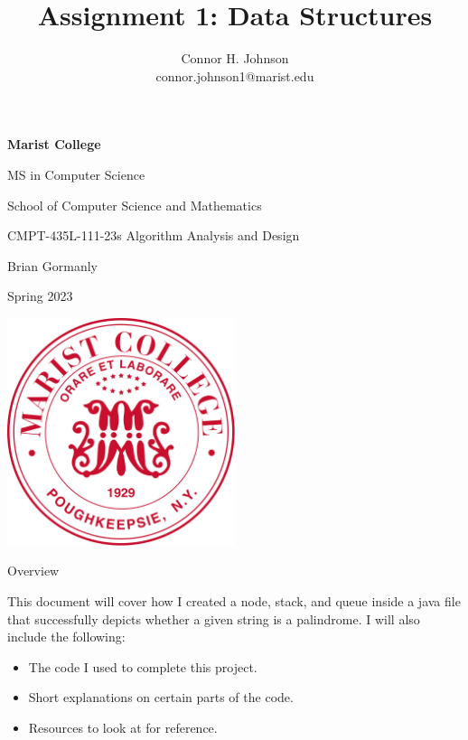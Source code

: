 \documentclass[a4paper,12pt]{article}
\title{Assignment 1: Data Structures}
\author{Connor H. Johnson \\ connor.johnson1@marist.edu}
\begin{document}
\begin{center} \vfill
\textbf{\Large Marist College}

{\large MS in Computer Science

School of Computer Science and Mathematics \vfill

CMPT-435L-111-23s Algorithm Analysis and Design 

Brian Gormanly

Spring 2023 

\vfill
\includegraphics[width=0.5\textwidth]{Marist.png} \vfill

\emph{\Large\thetitle} \vfill 
\theauthor} \vfill

\end{center} \clearpage
\maketitle

\begin{center}
\begin{large}
    Overview
\end{large}    
\end{center}

\begin{center} \noindent
This document will cover how I created a  node, stack, and queue inside a java file that successfully depicts whether a given string is a palindrome. I will also include the following:
\begin{itemize}
\item The code I used to complete this project.
\item Short explanations on certain parts of the code.
\item Resources to look at for reference.

\end{itemize}
\end{center}
\end{document}

